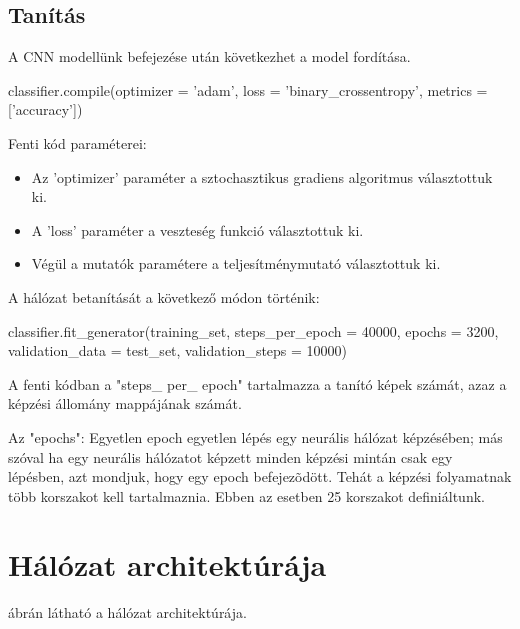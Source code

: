 \subsection{Tanítás}

A CNN modellünk befejezése után következhet a model fordítása.

\begin{python}
classifier.compile(optimizer = 'adam', loss = 'binary_crossentropy',
metrics = ['accuracy'])
\end{python}

Fenti kód paraméterei:
\begin{itemize}
\item Az 'optimizer' paraméter a sztochasztikus gradiens algoritmus választottuk ki.
\item A 'loss' paraméter a veszteség funkció választottuk ki.
\item Végül a mutatók paramétere a teljesítménymutató választottuk ki.
\end{itemize}

A hálózat betanítását a következő módon történik:

\begin{python}
classifier.fit_generator(training_set,
steps_per_epoch = 40000,
epochs = 3200,
validation_data = test_set,
validation_steps = 10000)
\end{python}

A fenti kódban a "steps\_ per\_ epoch" tartalmazza a tanító képek számát, azaz a képzési állomány mappájának számát.

Az "epochs": Egyetlen epoch egyetlen lépés egy neurális hálózat képzésében; más szóval ha egy neurális hálózatot képzett minden képzési mintán csak egy lépésben, azt mondjuk, hogy egy epoch befejezõdött. Tehát a képzési folyamatnak több korszakot kell tartalmaznia. Ebben az esetben 25 korszakot definiáltunk.

\newpage

\section{Hálózat architektúrája}

 ábrán látható a hálózat architektúrája.

